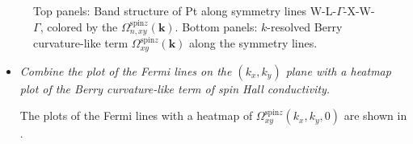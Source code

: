 \begin{figure}[htb!]
	\centering
	\qquad
	\caption{Top panels: Band structure of Pt along symmetry lines W-L-$\Gamma$-X-W-$\Gamma$, colored by
		the $\Omega_{n,xy}^{\text{spin}z}({\bm k})$. 
		Bottom panels: $k$-resolved Berry curvature-like term $\Omega_{xy}^{\text{spin}z}(\bm k)$ along the symmetry lines.}
	\label{fig29.1}
\end{figure}

\begin{itemize}
	\item {\it Combine the plot of the Fermi lines on the $(k_x,k_y)$ plane with a heatmap plot of the Berry curvature-like term of spin Hall conductivity.}
	
	The plots of the Fermi lines with a heatmap of $\Omega_{xy}^{\text{spin}z}(k_x,k_y,0)$ are shown in .
\end{itemize}

